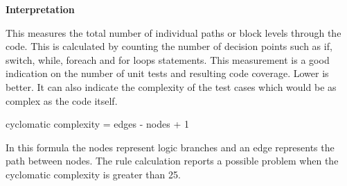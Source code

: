 		\vspace{-3mm}
		\large{\bfseries{Interpretation}}
		\vspace{1mm}
		
		\normalsize
		{
			This measures the total number of individual paths or block levels through the code. 
			This is calculated by counting the number of decision points such as if, switch, while, foreach and for loops statements. 
			This measurement is a good indication on the number of unit tests and resulting code coverage. Lower is better.		
			It can also indicate the complexity of the test cases which would be as complex as the code itself.				
			\begin{center}
				cyclomatic complexity = edges - nodes + 1
			\end{center}
			\vspace{3mm}
			In this formula the nodes represent logic branches and an edge represents the path between nodes.
			The rule calculation reports a possible problem when the cyclomatic complexity is greater than 25.
			\newline	
		}			
			
